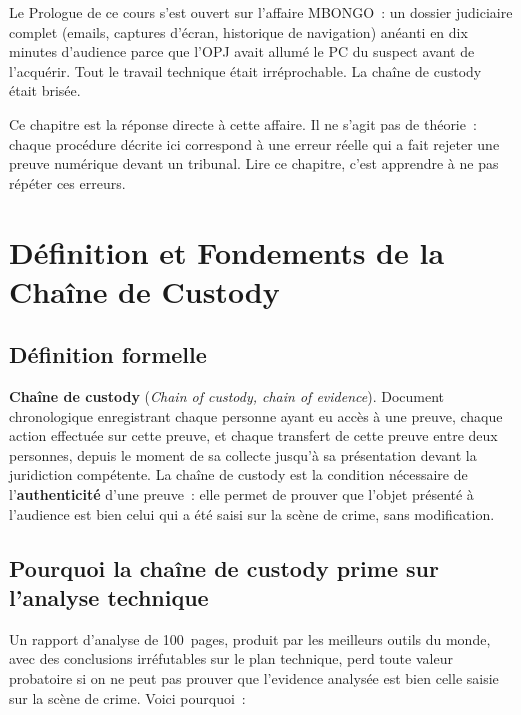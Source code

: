 Le Prologue de ce cours s'est ouvert sur l'affaire MBONGO~: un dossier
judiciaire complet (emails, captures d'écran, historique de navigation)
anéanti en dix minutes d'audience parce que l'OPJ avait allumé le PC du suspect
avant de l'acquérir. Tout le travail technique était irréprochable. La chaîne
de custody était brisée.

Ce chapitre est la réponse directe à cette affaire. Il ne s'agit pas de
théorie~: chaque procédure décrite ici correspond à une erreur réelle qui
a fait rejeter une preuve numérique devant un tribunal. Lire ce chapitre,
c'est apprendre à ne pas répéter ces erreurs.

\separateur

\section{Définition et Fondements de la Chaîne de Custody}
\label{sec:custody-fondements}

\subsection{Définition formelle}

\begin{boxdef}
\textbf{Chaîne de custody}
(\textit{Chain of custody, chain of evidence}). Document chronologique
enregistrant chaque personne ayant eu accès à une preuve, chaque action
effectuée sur cette preuve, et chaque transfert de cette preuve entre
deux personnes, depuis le moment de sa collecte jusqu'à sa présentation
devant la juridiction compétente. La chaîne de custody est la condition
nécessaire de l'\textbf{authenticité} d'une preuve~: elle permet de prouver
que l'objet présenté à l'audience est bien celui qui a été saisi sur la
scène de crime, sans modification.
\end{boxdef}

\subsection{Pourquoi la chaîne de custody prime sur l'analyse technique}

Un rapport d'analyse de 100~pages, produit par les meilleurs outils du
monde, avec des conclusions irréfutables sur le plan technique, perd toute
valeur probatoire si on ne peut pas prouver que l'evidence analysée est
bien celle saisie sur la scène de crime. Voici pourquoi~:

